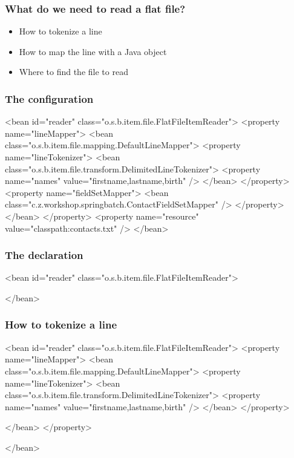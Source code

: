 \begin{frame}
 \frametitle{What do we need to read a flat file?}
 \begin{itemize}
  \item How to tokenize a line
  \item How to map the line with a Java object
  \item Where to find the file to read
 \end{itemize}
\end{frame}


\begin{frame}[fragile]
 \frametitle{The  configuration}

\begin{xmlcode}
<bean id="reader"
      class="o.s.b.item.file.FlatFileItemReader">
  <property name="lineMapper">
    <bean class="o.s.b.item.file.mapping.DefaultLineMapper">
      <property name="lineTokenizer">
        <bean class="o.s.b.item.file.transform.DelimitedLineTokenizer">
          <property name="names" value="firstname,lastname,birth" />
        </bean>
      </property>
      <property name="fieldSetMapper">
        <bean class="c.z.workshop.springbatch.ContactFieldSetMapper" />
      </property>
    </bean>
  </property>
  <property name="resource" value="classpath:contacts.txt" />
</bean>
\end{xmlcode}

\end{frame}

\begin{frame}[fragile]
 \frametitle{The  declaration}

\begin{xmlcode}
<bean id="reader"
      class="o.s.b.item.file.FlatFileItemReader">













</bean>
\end{xmlcode}

\end{frame}

\begin{frame}[fragile]
 \frametitle{How to tokenize a line}

\begin{xmlcode}
<bean id="reader"
      class="o.s.b.item.file.FlatFileItemReader">
  <property name="lineMapper">
    <bean class="o.s.b.item.file.mapping.DefaultLineMapper">
      <property name="lineTokenizer">
        <bean class="o.s.b.item.file.transform.DelimitedLineTokenizer">
          <property name="names" value="firstname,lastname,birth" />
        </bean>
      </property>



    </bean>
  </property>

</bean>
\end{xmlcode}
\end{frame}

